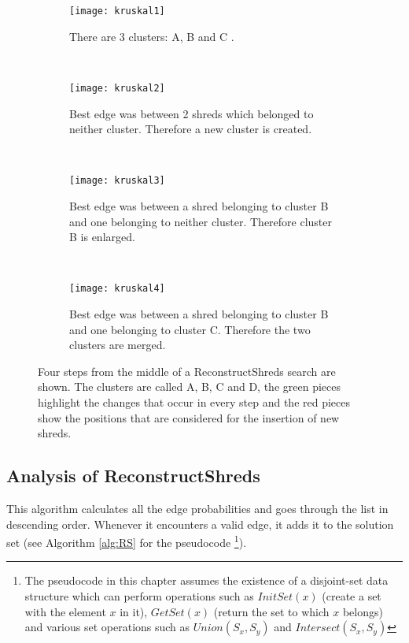 \begin{figure}[h]
        \centering
        \begin{subfigure}[b]{0.49\textwidth}
                \centering
                \texttt{[image: kruskal1]}
                \caption{There are 3 clusters: A, B and C \vspace{2\baselineskip}.}
        \end{subfigure}
        ~ 
        \begin{subfigure}[b]{0.49\textwidth}
                \centering
                \texttt{[image: kruskal2]}
                \caption{Best edge was between 2 shreds which belonged to neither cluster. Therefore a new cluster is created.}
        \end{subfigure}
        ~ 
        \begin{subfigure}[b]{0.49\textwidth}
                \centering
                \texttt{[image: kruskal3]}
                \caption{Best edge was between a shred belonging to cluster B and one belonging to neither cluster. Therefore cluster B is enlarged.}
        \end{subfigure}
        ~ 
        \begin{subfigure}[b]{0.49\textwidth}
                \centering
                \texttt{[image: kruskal4]}
                \caption{Best edge was between a shred belonging to cluster B and one belonging to cluster C. Therefore the two clusters are merged.}
        \end{subfigure}
        \caption{Four steps from the middle of a ReconstructShreds search are shown. The clusters are called A, B, C and D, the green pieces highlight the changes that occur in every step and the red pieces show the positions that are considered for the insertion of new shreds.}
        \label{fig:kruskal}
\end{figure}

\subsection{Analysis of ReconstructShreds}
This algorithm calculates all the edge probabilities and goes through the list in descending order. Whenever it encounters a valid edge, it adds it to the solution set (see Algorithm \ref{alg:RS} for the pseudocode \footnote{The pseudocode in this chapter assumes the existence of a disjoint-set data structure which can perform operations such as $InitSet(x)$ (create a set with the element $x$ in it), $GetSet(x)$ (return the set to which $x$ belongs) and various set operations such as $Union(S_x,S_y)$ and $Intersect(S_x,S_y)$}).


